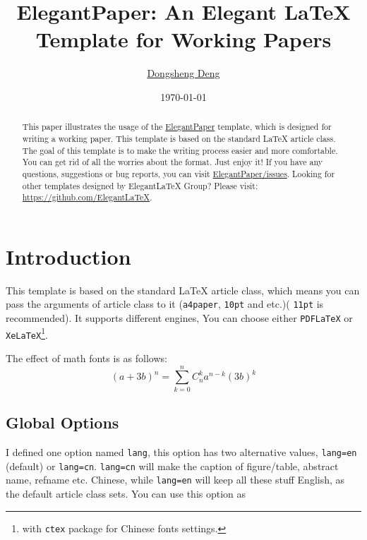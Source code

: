 \documentclass[11pt]{elegantpaper}
\title{ElegantPaper: An Elegant \LaTeX{} Template for Working Papers}
\author{\href{https://ddswhu.me/}{Dongsheng Deng}}
\institute{\href{https://github.com/ElegantLaTeX}{Elegant\LaTeX{} Program}}
\date{\today}
\begin{document}
\maketitle

\begin{abstract}
\noindent This paper illustrates the usage of the \href{https://github.com/ElegantLaTeX/ElegantPaper}{ElegantPaper} template, which is designed for writing a working paper. This template is based on the standard \LaTeX{} article class. The goal of this template is to make the writing process easier and more comfortable. You can get rid of all the worries about the format. Just enjoy it! If you have any questions, suggestions or bug reports, you can visit \href{https://github.com/ElegantLaTeX/ElegantPaper/issues}{ElegantPaper/issues}. Looking for other templates designed by Elegant\LaTeX{} Group? Please visit: \href{https://github.com/ElegantLaTeX}{https://github.com/ElegantLaTeX}.\par
{}
\end{abstract}


\section{Introduction}

This template is based on the standard \LaTeX{} article class, which means you can pass the arguments of article class to it (\lstinline{a4paper}, \lstinline{10pt} and etc.)( \lstinline{11pt} is recommended). It supports different engines, You can choose either \lstinline{PDFLaTeX} or \lstinline{XeLaTeX}\footnote{with \lstinline{ctex} package for Chinese fonts settings.}.  

The effect of math fonts is as follows:
\begin{equation}
(a+3b)^{n} = \sum_{k=0}^{n} C_{n}^{k} a^{n-k} (3b)^k  \label{eq:binom}
\end{equation}

\subsection{Global Options}
I defined one option named \lstinline{lang}, this option has two alternative values, \lstinline{lang=en} (default) or \lstinline{lang=cn}. \lstinline{lang=cn} will make the caption of figure/table, abstract name, refname etc. Chinese, while \lstinline{lang=en} will keep all these stuff English, as the default article class sets. You can use this option as
\end{document}
